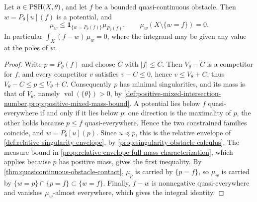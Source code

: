 \begin{proposition}\label{prop:singularity-obstacle-contact}
Let $u\in\mathrm{PSH}(X,\theta)$, and let $f$ be a bounded quasi-continuous obstacle. Then $w=P_\theta[u](f)$ is a potential, and
\[
 \mu_w\leq\mathbf1_{\{w=P_\theta(f)\}}\mu_{P_\theta(f)},
                \qquad \mu_w(X\setminus\{w=f\})=0.
\]
In particular $\int_X(f-w)\,\mu_w=0$, where the integrand may be given any value at the poles of $w$.
\end{proposition}
\begin{proof}
Write $p=P_\theta(f)$ and choose $C$ with $|f|\leq C$. Then $V_\theta-C$ is a competitor for $f$, and every competitor $v$ satisfies $v-C\leq0$, hence $v\leq V_\theta+C$; thus $V_\theta-C\leq p\leq V_\theta+C$. Consequently $p$ has minimal singularities, and its mass is that of $V_\theta$, namely $\operatorname{vol}(\{\theta\})>0$, by \cref{def:positive-mixed-intersection-number,prop:positive-mixed-mass-bound}. A potential lies below $f$ quasi-everywhere if and only if it lies below $p$: one direction is the maximality of $p$, the other holds because $p\leq f$ quasi-everywhere. Hence the two constrained families coincide, and $w=P_\theta[u](p)$. Since $u\preceq p$, this is the relative envelope of \cref{def:relative-singularity-envelope}, by \cref{prop:singularity-obstacle-calculus}. The measure bound in \cref{prop:relative-envelope-full-mass-characterization}, which applies because $p$ has positive mass, gives the first inequality. By \cref{thm:quasicontinuous-obstacle-contact}, $\mu_p$ is carried by $\{p=f\}$, so $\mu_w$ is carried by $\{w=p\}\cap\{p=f\}\subset\{w=f\}$. Finally, $f-w$ is nonnegative quasi-everywhere and vanishes $\mu_w$-almost everywhere, which gives the integral identity.
\end{proof}

